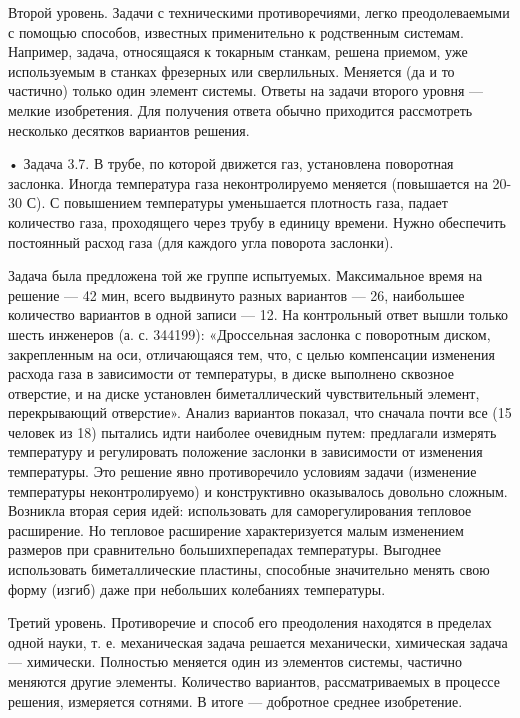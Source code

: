 Второй   уровень.   Задачи   с  техническими   противоречиями,   легко
преодолеваемыми   с  помощью   способов,  известных   применительно  к
родственным  системам.   Например,  задача,  относящаяся   к  токарным
станкам,  решена приемом,  уже  используемым в  станках фрезерных  или
сверлильных. Меняется (да и то  частично) только один элемент системы.
Ответы на  задачи второго уровня  — мелкие изобретения.  Для получения
ответа  обычно  приходится  рассмотреть несколько  десятков  вариантов
решения.

• Задача 3.7. В трубе, по которой движется газ, установлена поворотная
заслонка. Иногда температура газа неконтролируемо меняется (повышается
на  20-30 С).  С повышением  температуры уменьшается  плотность газа,
падает  количество газа,  проходящего через  трубу в  единицу времени.
Нужно  обеспечить постоянный  расход газа  (для каждого  угла поворота
заслонки).

Задача  была   предложена  той  же  группе   испытуемых.  Максимальное
время  на  решение  —  42  мин, всего  выдвинуто  разных  вариантов  —
26,  наибольшее  количество   вариантов  в  одной  записи   —  12.  На
контрольный  ответ  вышли  только  шесть  инженеров  (а.  с.  344199):
«Дроссельная  заслонка  с  поворотным  диском,  закрепленным  на  оси,
отличающаяся тем,  что, с целью  компенсации изменения расхода  газа в
зависимости  от температуры,  в  диске  выполнено сквозное  отверстие,
и   на  диске   установлен  биметаллический   чувствительный  элемент,
перекрывающий  отверстие».  Анализ   вариантов  показал,  что  сначала
почти  все  (15  человек  из  18)  пытались  идти  наиболее  очевидным
путем:  предлагали  измерять   температуру  и  регулировать  положение
заслонки  в зависимости  от  изменения температуры.  Это решение  явно
противоречило условиям задачи  (изменение температуры неконтролируемо)
и конструктивно  оказывалось довольно  сложным. Возникла  вторая серия
идей:  использовать  для  саморегулирования  тепловое  расширение.  Но
тепловое  расширение  характеризуется  малым изменением  размеров  при
сравнительно   большихперепадах  температуры.   Выгоднее  использовать
биметаллические  пластины,  способные  значительно менять  свою  форму
(изгиб) даже при небольших колебаниях температуры.

Третий  уровень. Противоречие  и  способ его  преодоления находятся  в
пределах одной науки, т.  е. механическая задача решается механически,
химическая задача  — химически.  Полностью меняется один  из элементов
системы,  частично  меняются  другие элементы.  Количество  вариантов,
рассматриваемых  в процессе  решения,  измеряется сотнями.  В итоге  —
добротное среднее изобретение.

